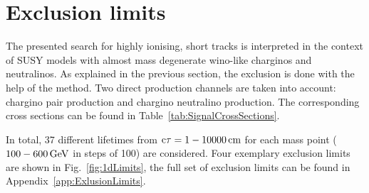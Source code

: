 \section{Exclusion limits}
\label{sec:ExclusionLimits}

The presented search for highly ionising, short tracks is interpreted in the context of SUSY models with almost mass degenerate wino-like charginos and neutralinos.
As explained in the previous section, the exclusion is done with the help of the \CLs method.
Two direct production channels are taken into account: chargino pair production and chargino neutralino production. 
The corresponding cross sections can be found in Table~\ref{tab:SignalCrossSections}.

In total, 37 different lifetimes from $\text{c}\tau=1-10000\,\text{cm}$ for each mass point ($100-600\,\text{Ge}\kern-0.06667em\text{V}$ in steps of 100\gev) are considered. %
Four exemplary exclusion limits are shown in Fig.~\ref{fig:1dLimits}, the full set of exclusion limits can be found in Appendix~\ref{app:ExlusionLimits}.\\

